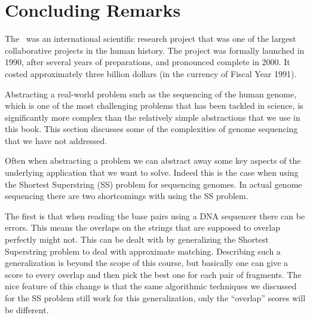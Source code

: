 \section{Concluding Remarks}
\begin{gram}
The~ was an international scientific
research project that was one of the largest collaborative projects in
the human history. 
%
The project was formally launched in 1990, after several years of
preparations, and pronounced complete in 2000.
%
It costed approximately three billion dollars (in the currency of
Fiscal Year 1991).

Abstracting a real-world problem such as the sequencing of the human
genome, which is one of the most challenging problems that has been
tackled in science, is significantly more complex than the relatively
simple abstractions that we  use in this book.  
%
This section discusses some of the complexities of genome sequencing
that we have not addressed.
\end{gram}

\begin{gram}
Often when abstracting a problem we can abstract away some key aspects
of the underlying application that we want to solve.  Indeed this is
the case when using the Shortest Superstring (SS) problem for
sequencing genomes.  In actual genome sequencing there are two
shortcomings with using the SS problem.
\end{gram}

\begin{gram}
The first is that when reading the base pairs using a DNA sequencer
there can be errors.  This means the overlaps on the strings that are
supposed to overlap perfectly might not.  This can be dealt with by
generalizing the Shortest Superstring problem to deal with approximate
matching.  Describing such a generalization is beyond the scope of
this course, but basically one can give a score to every overlap and
then pick the best one for each pair of fragments.  The nice feature
of this change is that the same algorithmic techniques we discussed
for the SS problem still work for this generalization, only the
``overlap'' scores will be different.
\end{gram}

